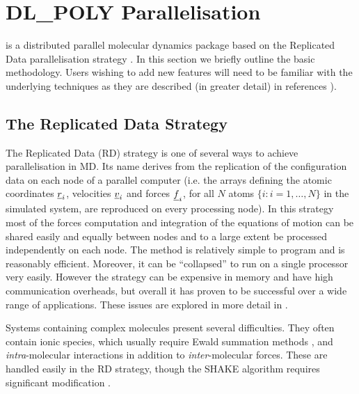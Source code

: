 \section{DL\_POLY Parallelisation}


\D{} is a distributed parallel molecular dynamics package based on
the Replicated Data parallelisation strategy 
\cite{smith-91a,smith-93a}.  In this section we briefly outline the basic
methodology. Users wishing to add new features \D{} will need to
be familiar with the underlying techniques as they are described (in
greater detail) in references \cite{smith-93b,smith-93a}).

\subsection{The Replicated Data Strategy}
\label{parallelisation}
The Replicated Data (RD) strategy \cite{smith-91a} is one of several
ways to achieve parallelisation in MD. 
Its name derives from the
replication of the configuration data on each node of a parallel
computer (i.e. the arrays defining the atomic coordinates
$\mbox{$\underline{r}$}_{i}$, velocities $\mbox{$\underline{v}$}_{i}$ and forces $\mbox{$\underline{f}$}_{i}$, for
all $N$ atoms $\{i: i=1,\dots,N\}$ in the simulated system, are
reproduced on every processing node). In this strategy most of the
forces computation and integration of the equations of motion can be
shared easily and equally between nodes and to a large extent be
processed independently on each node. The method is relatively simple
to program and is reasonably efficient. Moreover, it can be
``collapsed'' to run on a single processor very easily.  However the
strategy can be expensive in memory and have high communication
overheads, but overall it has proven to be successful over a wide
range of applications.  These issues are explored in more detail in
\cite{smith-91a,smith-93a}.

Systems containing complex molecules present several difficulties.
They often contain ionic species, which usually require Ewald summation methods \cite{allen-89a,smith-92b}, and {\em intra}-molecular
interactions in addition to {\em inter}-molecular forces.  These are
handled easily in the RD strategy, though the SHAKE algorithm
\cite{ryckaert-77a} requires significant modification \cite{smith-93b}.

